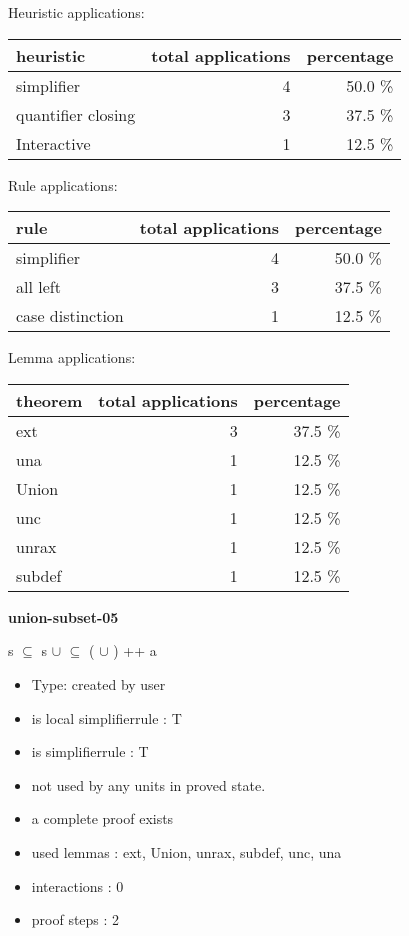 \documentclass[a4paper]{article}
\begin{document}
\medskip


Heuristic applications:

\begin{supertabular}{l|r|r}
heuristic	& total applications & percentage \\ \hline
simplifier & 4 & 50.0 \% \\
quantifier closing & 3 & 37.5 \% \\
Interactive & 1 & 12.5 \% \\

\end{supertabular}

Rule applications:

\begin{supertabular}{l|r|r}
rule	        & total applications & percentage \\ \hline
simplifier & 4 & 50.0 \% \\
all left & 3 & 37.5 \% \\
case distinction & 1 & 12.5 \% \\

\end{supertabular}

Lemma applications:

\begin{supertabular}{l|r|r}
theorem	        & total applications & percentage \\ \hline
ext & 3 & 37.5 \% \\
una & 1 & 12.5 \% \\
Union & 1 & 12.5 \% \\
unc & 1 & 12.5 \% \\
unrax & 1 & 12.5 \% \\
subdef & 1 & 12.5 \% \\

\end{supertabular}
\pagebreak

{\LARGE\bf union-subset-05}\label{lemma-union-subset-05}

\medskip

 \Fol s $\subseteq$  \Imp s $\cup$  $\subseteq$ ( $\cup$ ) ++ a

\begin{itemize}

\item Type: created by user

\item is local simplifierrule : T
\item is simplifierrule : T
\item not used by any units in proved state.
\item       a complete proof exists
\item       used lemmas  : ext, Union, unrax, subdef, unc, una
\item       interactions : 0
\item       proof steps  : 2
\end{itemize}
\end{document}
